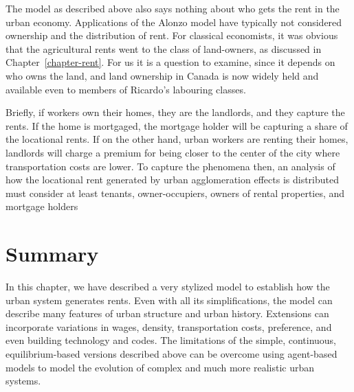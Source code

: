 The model as described above also says nothing about who gets the rent in the urban economy. Applications of the \Gls{Alonzo model} have typically not considered ownership and the distribution of rent. For classical economists, it was obvious that the agricultural rents went to the class of land-owners, as discussed in Chapter~\ref{chapter-rent}. 
For us it is a question to examine, since it depends on who owns the land, and land ownership in Canada is now widely held and available even to members of Ricardo's labouring classes.
 
Briefly, if workers own their homes, they are the landlords, and they capture the rents. If the home is mortgaged, the mortgage holder will be capturing a share of the locational rents. If on the other hand, urban workers are renting their homes, landlords will charge a premium for being closer to the center of the city where transportation costs are lower. To capture the phenomena then, an analysis of how the locational rent generated by urban agglomeration effects is distributed must consider at least tenants, owner-occupiers, owners of rental properties, and mortgage holders 


\section{Summary}

In this chapter, we have described a very stylized model to  establish how the urban system generates rents. Even with all its simplifications, the model can describe many features of urban structure and urban history.   %
Extensions can incorporate variations in wages, density, transportation costs, preference, and even building technology and codes. The limitations of the simple, continuous, equilibrium-based versions described above can be overcome using agent-based models to model the evolution of complex and much more realistic urban systems. 


